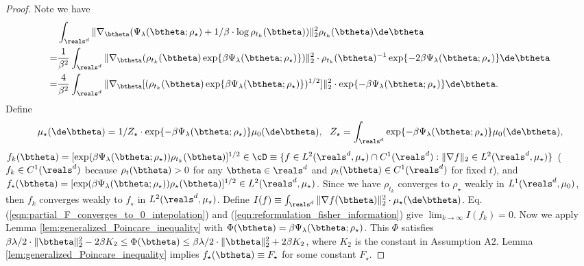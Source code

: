 \documentclass[11pt]{article}
\begin{document}
\begin{proof}
Note we have 
\begin{equation}\label{eqn:reformulation_fisher_information}
\begin{aligned}
&\int_{\reals^d} \| \nabla_\btheta(\Psi_\lambda(\btheta; \rho_\star) + 1/\beta \cdot \log \rho_{t_k}(\btheta)) \|_2^2 \rho_{t_k}(\btheta) \de \btheta \\
=&\frac{1}{\beta^2} \int_{\reals^d} \| \nabla_\btheta (\rho_{t_k}(\btheta) \exp\{ \beta \Psi_\lambda(\btheta; \rho_\star) \} ) \|_2^2 \cdot \rho_{t_k}(\btheta)^{-1} \exp\{ - 2\beta \Psi_\lambda(\btheta; \rho_\star) \} \de \btheta\\
=& \frac{4}{\beta^2} \int_{\reals^d} \| \nabla_\btheta [(\rho_{t_k}(\btheta) \exp\{ \beta \Psi_\lambda(\btheta; \rho_\star) \} )^{1/2}] \|_2^2 \cdot \exp\{ - \beta \Psi_\lambda(\btheta; \rho_\star) \} \de \btheta. 
\end{aligned}
\end{equation}
Define 
\begin{align}
\mu_\star(\de \btheta) = 1/ Z_\star \cdot \exp\{ - \beta \Psi_\lambda(\btheta; \rho_\star) \} \mu_0(\de \btheta), ~~ Z_\star = \int_{\reals^d}\exp\{ - \beta \Psi_\lambda(\btheta; \rho_\star) \} \mu_0(\de \btheta), 
\end{align}
$f_k(\btheta) = [\exp(\beta \Psi_\lambda(\btheta; \rho_\star)) \rho_{t_k}(\btheta)]^{1/2} \in \cD \equiv \{ f \in L^2(\reals^d, \mu_\star) \cap C^1(\reals^d): \| \nabla f\|_2 \in L^2(\reals^d, \mu_\star) \}$ ($f_{k} \in C^1(\reals^d)$ because $\rho_{t}(\btheta) > 0$ for any $\btheta \in \reals^d$ and $\rho_t(\btheta) \in C^1(\reals^d)$ for fixed $t$), and $f_\star(\btheta) = [\exp(\beta \Psi_\lambda(\btheta; \rho_\star)) \rho_\star (\btheta)]^{1/2} \in L^2(\reals^d, \mu_\star)$. Since we have $\rho_{t_k}$ converges to $\rho_\star$ weakly in $L^1(\reals^d, \mu_0)$, then $f_k$ converges weakly to $f_\star$ in $L^2(\reals^d, \mu_\star)$. Define $I(f) \equiv \int_{\reals^d} \| \nabla f (\btheta) \|_2^2 \cdot \mu_\star(\de \btheta)$. Eq. (\ref{eqn:partial_F_converges_to_0_intepolation}) and (\ref{eqn:reformulation_fisher_information}) give $\lim_{k \to \infty} I(f_k) = 0$. Now we apply Lemma \ref{lem:generalized_Poincare_inequality} with $\Phi(\btheta) = \beta \Psi_\lambda(\btheta; \rho_\star)$. This $\Phi$ satisfies $\beta \lambda/2 \cdot \| \btheta \|_2^2 - 2 \beta K_2 \le \Phi(\btheta) \le \beta \lambda/2 \cdot \| \btheta \|_2^2 + 2 \beta K_2$, where $K_2$ is the constant in Assumption {\sf A2}. Lemma \ref{lem:generalized_Poincare_inequality} implies $f_\star(\btheta) \equiv F_\star$ for some constant $F_\star$. 


\end{proof}
\end{document}
